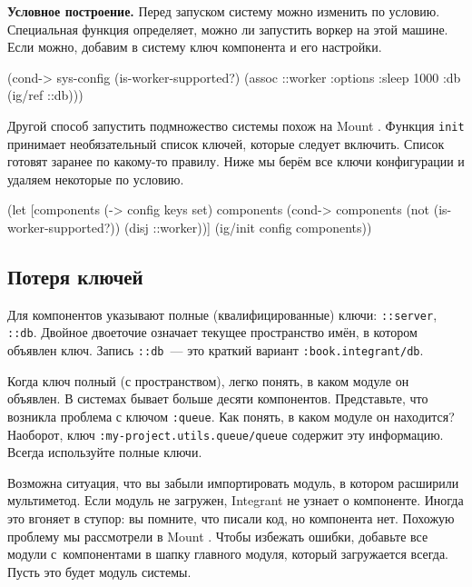 
\textbf{Условное построение.} Перед запуском систему можно изменить по
условию. Специальная функция определяет, можно ли запустить воркер на этой
машине. Если можно, добавим в систему ключ компонента и его настройки.

\begin{english}
  \begin{clojure}
(cond-> sys-config
  (is-worker-supported?)
  (assoc ::worker {:options {:sleep 1000}
                   :db (ig/ref ::db)}))
  \end{clojure}
\end{english}

Другой способ запустить подмножество системы похож на
Mount . Функция \verb|init| принимает необязательный
список ключей, которые следует включить. Список готовят заранее по какому-то
правилу. Ниже мы берём все ключи конфигурации и удаляем некоторые по условию.

\begin{english}
  \begin{clojure}
(let [components (-> config keys set)
      components (cond-> components
                   (not (is-worker-supported?))
                   (disj ::worker))]
  (ig/init config components))
  \end{clojure}
\end{english}

\subsection{Потеря ключей}


Для компонентов указывают полные (квалифицированные) ключи: \verb|::server|,
\verb|::db|. Двойное двоеточие означает текущее пространство имён, в котором
объявлен ключ. Запись \verb|::db|~--- это краткий вариант
\verb|:book.integrant/db|.

Когда ключ полный (с пространством), легко понять, в каком модуле он объявлен. В
системах бывает больше десяти компонентов. Представьте, что возникла проблема с
ключом \verb|:queue|. Как понять, в каком модуле он находится?  Наоборот, ключ
\verb|:my-project.utils.queue/queue| содержит эту информацию. Всегда используйте
полные ключи.

Возможна ситуация, что вы забыли импортировать модуль, в котором расширили
мультиметод. Если модуль не загружен, Integrant не узнает о компоненте. Иногда
это вгоняет в ступор: вы помните, что писали код, но компонента нет. Похожую
проблему мы рассмотрели в Mount . Чтобы избежать ошибки,
добавьте все модули с~компонентами в шапку главного модуля, который загружается
всегда. Пусть это будет модуль системы.

